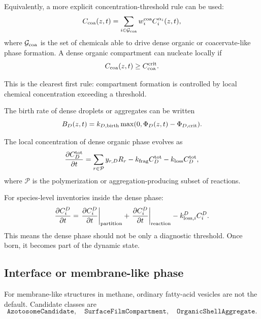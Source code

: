 \documentclass[11pt]{article}
\begin{document}
Equivalently, a more explicit concentration-threshold rule can be used:
\begin{equation}
C_{\rm coa}(z,t)
=
\sum_{i\in\mathcal{G}_{\rm coa}} w_i^{\rm coa} C_i^{\alpha_i}(z,t),
\end{equation}
where $\mathcal{G}_{\rm coa}$ is the set of chemicals able to drive dense organic or coacervate-like phase formation. A dense organic compartment can nucleate locally if
\begin{equation}
C_{\rm coa}(z,t) \ge C_{\rm coa}^{\rm crit}.
\end{equation}

This is the clearest first rule: compartment formation is controlled by local chemical concentration exceeding a threshold.

The birth rate of dense droplets or aggregates can be written
\begin{equation}
B_D(z,t)
=
k_{D,\rm birth}
\max(0,\Phi_D(z,t)-\Phi_{D,\rm crit}).
\end{equation}

The local concentration of dense organic phase evolves as
\begin{equation}
\frac{\partial C_D^{\rm tot}}{\partial t}
=
\sum_{r\in \mathcal{P}} y_{r,D} R_r
- k_{\rm frag}C_D^{\rm tot}
- k_{\rm loss}C_D^{\rm tot},
\end{equation}
where $\mathcal{P}$ is the polymerization or aggregation-producing subset of reactions.

For species-level inventories inside the dense phase:
\begin{equation}
\frac{\partial C_i^D}{\partial t}
=
\left.\frac{\partial C_i^D}{\partial t}\right|_{\rm partition}
+
\left.\frac{\partial C_i^D}{\partial t}\right|_{\rm reaction}
-k_{{\rm loss},i}^D C_i^D.
\end{equation}
This means the dense phase should not be only a diagnostic threshold. Once born, it becomes part of the dynamic state.

\subsection{Interface or membrane-like phase}

For membrane-like structures in methane, ordinary fatty-acid vesicles are not the default. Candidate classes are
\begin{equation}
\texttt{AzotosomeCandidate}, \quad
\texttt{SurfaceFilmCompartment}, \quad
\texttt{OrganicShellAggregate}.
\end{equation}
\end{document}
